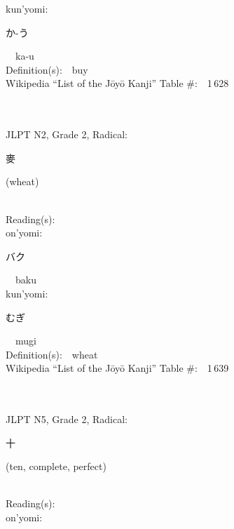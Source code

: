 \begin{multicols}{2}
{\hspace*{1em}}kun'yomi:\ \ \\
{\hspace*{2em}}{\begin{CJK}{UTF8}{min} か-う \end{CJK}}\ \ ka-u\ \ \\
Definition(s):\ \ buy \\
Wikipedia ``List of the J\=oy\=o Kanji'' Table \#:\ \ 1\,628 \\
\ \ \\
{\fontsize{34pt}{40pt}  }\ \ \\  %
{JLPT N2, Grade 2, Radical:\ \ {\begin{CJK}{UTF8}{min} 麥 \end{CJK}} (wheat) } \\
Reading(s):\ \ \\
{\hspace*{1em}}on'yomi:\ \ \\
{\hspace*{2em}}{\begin{CJK}{UTF8}{min} バク \end{CJK}}\ \ baku\ \ \\
{\hspace*{1em}}kun'yomi:\ \ \\
{\hspace*{2em}}{\begin{CJK}{UTF8}{min} むぎ \end{CJK}}\ \ mugi\ \ \\
Definition(s):\ \ wheat \\
Wikipedia ``List of the J\=oy\=o Kanji'' Table \#:\ \ 1\,639 \\
\ \ \\
{\fontsize{34pt}{40pt}  }\ \ \\  %
{JLPT N5, Grade 2, Radical:\ \ {\begin{CJK}{UTF8}{min} 十 \end{CJK}} (ten, complete, perfect) } \\
Reading(s):\ \ \\
{\hspace*{1em}}on'yomi:\ \ \\

\end{multicols}
